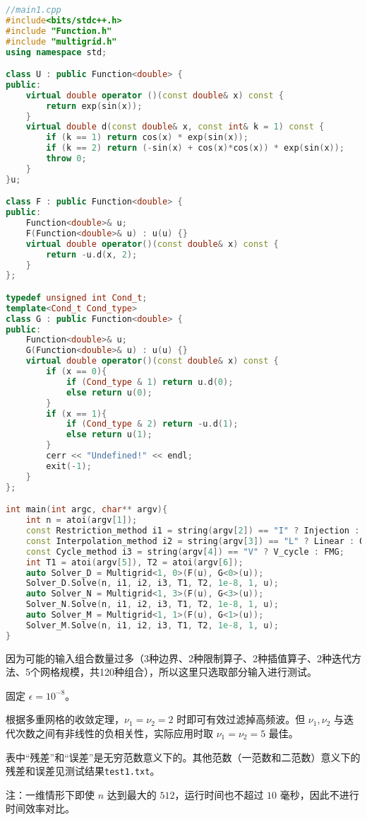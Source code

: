 \documentclass{ctexart}
\begin{document}
\begin{lstlisting}[language=c++]
//main1.cpp
#include<bits/stdc++.h>
#include "Function.h"
#include "multigrid.h"
using namespace std;

class U : public Function<double> {
public:
	virtual double operator ()(const double& x) const {
		return exp(sin(x));
	}
	virtual double d(const double& x, const int& k = 1) const {
		if (k == 1) return cos(x) * exp(sin(x));
		if (k == 2) return (-sin(x) + cos(x)*cos(x)) * exp(sin(x));
		throw 0;
	}
}u;

class F : public Function<double> {
public:
	Function<double>& u;
	F(Function<double>& u) : u(u) {}
	virtual double operator()(const double& x) const {
		return -u.d(x, 2);
	}
};

typedef unsigned int Cond_t;
template<Cond_t Cond_type>
class G : public Function<double> {
public:
	Function<double>& u;
	G(Function<double>& u) : u(u) {}
	virtual double operator()(const double& x) const {
		if (x == 0){
			if (Cond_type & 1) return u.d(0);
			else return u(0);
		}
		if (x == 1){
			if (Cond_type & 2) return -u.d(1);
			else return u(1);
		}
		cerr << "Undefined!" << endl;
		exit(-1);
	}
};

int main(int argc, char** argv){
	int n = atoi(argv[1]);
	const Restriction_method i1 = string(argv[2]) == "I" ? Injection : Full_Weighting;
	const Interpolation_method i2 = string(argv[3]) == "L" ? Linear : Quadratic;
	const Cycle_method i3 = string(argv[4]) == "V" ? V_cycle : FMG;
	int T1 = atoi(argv[5]), T2 = atoi(argv[6]);
	auto Solver_D = Multigrid<1, 0>(F(u), G<0>(u));
	Solver_D.Solve(n, i1, i2, i3, T1, T2, 1e-8, 1, u);
	auto Solver_N = Multigrid<1, 3>(F(u), G<3>(u));
	Solver_N.Solve(n, i1, i2, i3, T1, T2, 1e-8, 1, u);
	auto Solver_M = Multigrid<1, 1>(F(u), G<1>(u));
	Solver_M.Solve(n, i1, i2, i3, T1, T2, 1e-8, 1, u);
}
\end{lstlisting}

因为可能的输入组合数量过多（3种边界、2种限制算子、2种插值算子、2种迭代方法、5个网格规模，共120种组合），所以这里只选取部分输入进行测试。

固定 $\epsilon = 10^{-8}$。

根据多重网格的收敛定理，$\nu_1=\nu_2=2$ 时即可有效过滤掉高频波。但 $\nu_1,\nu_2$ 与迭代次数之间有非线性的负相关性，实际应用时取 $\nu_1=\nu_2=5$ 最佳。

表中“残差”和“误差”是无穷范数意义下的。其他范数（一范数和二范数）意义下的残差和误差见测试结果\verb|test1.txt|。

注：一维情形下即使 $n$ 达到最大的 $512$，运行时间也不超过 $10$ 毫秒，因此不进行时间效率对比。
\end{document}
